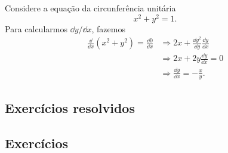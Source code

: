 \begin{ex}
  Considere a equação da circunferência unitária
  \begin{equation}
    x^2 + y^2 = 1.
  \end{equation}
  Para calcularmos $\dd y/\dd x$, fazemos
  \begin{align}
    \frac{\dd}{\dd x}\left(x^2+y^2\right) = \frac{\dd 0}{\dd x} &\Rightarrow 2x + \frac{\dd y^2}{\dd y}\frac{\dd y}{\dd x}\\
                                                                &\Rightarrow 2x + 2y\frac{\dd y}{\dd x} = 0\\
                                                                &\Rightarrow \frac{\dd y}{\dd x} = -\frac{x}{y}.
  \end{align}
\end{ex}

\subsection*{Exercícios resolvidos}

\emconstrucao

\subsection*{Exercícios}

\emconstrucao
